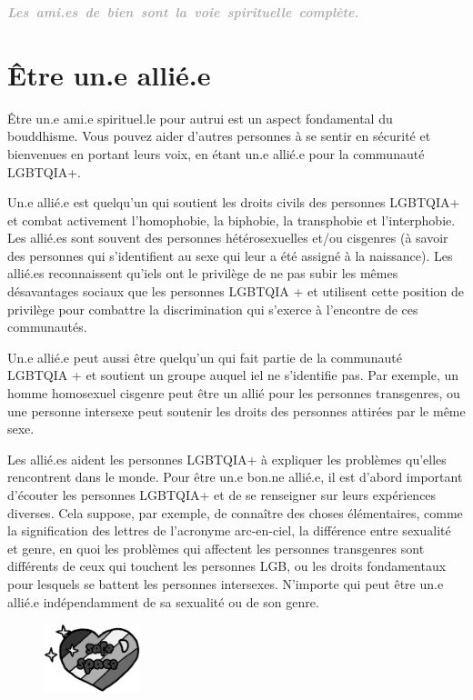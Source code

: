\documentclass[12pt,openany]{book}
\renewenvironment{quote}{%
  \list{}{%
    \leftmargin-0.1cm   %
    \rightmargin\leftmargin
  }
  \item\relax
}
{\endlist}
\begin{document}
\begingroup
\begin{quote}
\centering
\textit{\Large \textbf{\textcolor{darkgray}{\mbox{Les ami.es de bien sont la voie spirituelle complète.}}}}
\end{quote}
\endgroup

\section*{Être un.e allié.e}

\noindent Être un.e ami.e spirituel.le pour autrui est un aspect fondamental du bouddhisme. Vous pouvez aider d’autres personnes à se sentir en sécurité et bienvenues en portant leurs voix, en étant un.e allié.e pour la communauté \mbox{LGBTQIA+}.

Un.e allié.e est quelqu’un qui soutient les droits civils des personnes \mbox{LGBTQIA+} et combat activement l'homophobie, la biphobie, la transphobie et l'interphobie. Les allié.es sont souvent des personnes hétérosexuelles et/ou cisgenres (à savoir des personnes qui s’identifient au sexe qui leur a été assigné à la naissance). Les allié.es reconnaissent qu’iels ont le privilège de ne pas subir les mêmes désavantages sociaux que les personnes LGBTQIA + et utilisent cette position de privilège pour combattre la discrimination qui s’exerce à l’encontre de ces communautés.

Un.e allié.e peut aussi être quelqu’un qui fait partie de la communauté LGBTQIA + et soutient un groupe auquel iel ne s’identifie pas. Par exemple, un homme homosexuel cisgenre peut être un allié pour les personnes transgenres, ou une personne intersexe peut soutenir les droits des personnes attirées par le même sexe.

Les allié.es aident les personnes \mbox{LGBTQIA+} à expliquer les problèmes qu’elles rencontrent dans le monde. Pour être un.e bon.ne allié.e, il est d’abord important d’écouter les personnes \mbox{LGBTQIA+} et de se renseigner sur leurs expériences diverses. Cela suppose, par exemple, de connaître des choses élémentaires, comme la signification des lettres de l’acronyme arc-en-ciel, la différence entre sexualité et genre, en quoi les problèmes qui affectent les personnes transgenres sont différents de ceux qui touchent les personnes LGB, ou les droits fondamentaux pour lesquels se battent les personnes intersexes. N’importe qui peut être un.e allié.e indépendamment de sa sexualité ou de son genre.
\begin{figure}
    \centering
    \includegraphics[width=0.25\textwidth]{12bw.png}
\end{figure}
\end{document}
